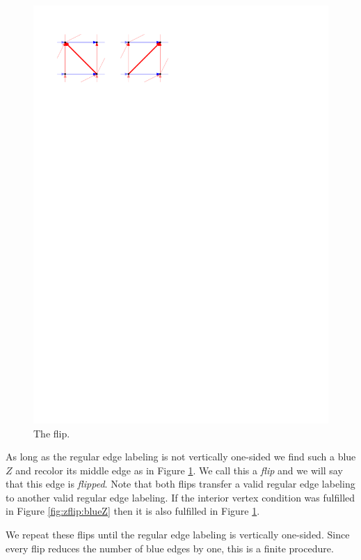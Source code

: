 \begin{figure}[!b]
    \includegraphics[scale=1]{unifiedAlgo/img/zflip/flip.pdf}
    \caption{The flip.}
    \label{fig:zflip:flip}
  \end{figure}

  As long as the regular edge labeling is not vertically one-sided we find such a blue $Z$ and recolor its middle edge as in Figure \ref{fig:zflip:flip}. We call this a \emph{flip} and we will say that this edge is \emph{flipped}.
  Note that both flips transfer a valid regular edge labeling to another valid regular edge labeling. If the interior vertex condition was fulfilled in Figure \ref{fig:zflip:blueZ} then it is also fulfilled in Figure \ref{fig:zflip:flip}.

  We repeat these flips until the regular edge labeling is vertically one-sided.
  Since every flip reduces the number of blue edges by one, this is a finite procedure.


